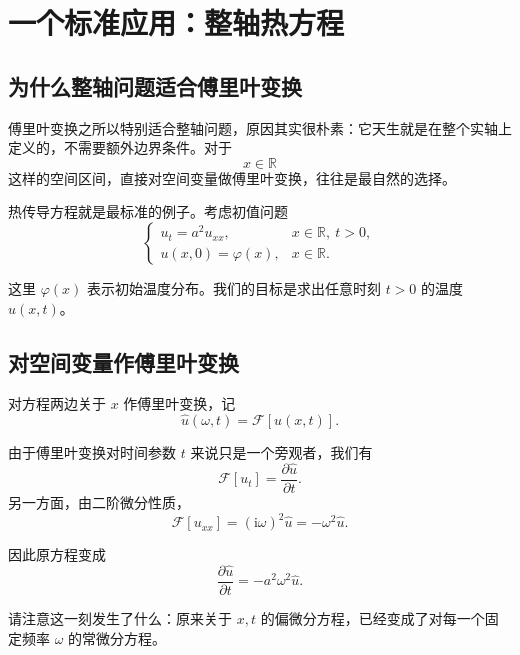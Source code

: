 \section{一个标准应用：整轴热方程}

\subsection{为什么整轴问题适合傅里叶变换}

傅里叶变换之所以特别适合整轴问题，原因其实很朴素：它天生就是在整个实轴上定义的，不需要额外边界条件。对于
\[
    x\in \mathbb{R}
\]
这样的空间区间，直接对空间变量做傅里叶变换，往往是最自然的选择。

热传导方程就是最标准的例子。考虑初值问题
\begin{equation}
    \begin{cases}
        u_t=a^2u_{xx}, & x\in\mathbb{R},\ t>0, \\
        u(x,0)=\varphi(x), & x\in\mathbb{R}.
    \end{cases}
\end{equation}

这里 $\varphi(x)$ 表示初始温度分布。我们的目标是求出任意时刻 $t>0$ 的温度 $u(x,t)$。

\subsection{对空间变量作傅里叶变换}

对方程两边关于 $x$ 作傅里叶变换，记
\begin{equation}
    \hat{u}(\omega,t)=\mathcal{F}[u(x,t)].
\end{equation}

由于傅里叶变换对时间参数 $t$ 来说只是一个旁观者，我们有
\begin{equation}
    \mathcal{F}[u_t]=\frac{\partial \hat{u}}{\partial t}.
\end{equation}
另一方面，由二阶微分性质，
\begin{equation}
    \mathcal{F}[u_{xx}]
    =
    (\mathrm{i}\omega)^2\hat{u}
    =
    -\omega^2 \hat{u}.
\end{equation}

因此原方程变成
\begin{equation}
    \frac{\partial \hat{u}}{\partial t}
    =
    -a^2\omega^2 \hat{u}.
\end{equation}

请注意这一刻发生了什么：原来关于 $x,t$ 的偏微分方程，已经变成了对每一个固定频率 $\omega$ 的常微分方程。

